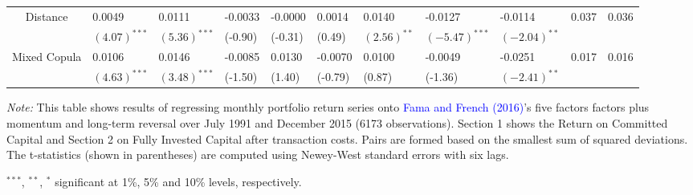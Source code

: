 \documentclass[a4paper]{article}
\begin{document}
\begin{table}[!ht]
\begin{threeparttable}[H]
\begin{tabularx}{\textwidth}{@{\extracolsep{\fill}} lllllllllll@{}}
		\multicolumn{1}{c}{Distance} & 0.0049 & 0.0111 & -0.0033 & -0.0000 & 0.0014 & 0.0140 & -0.0127 & -0.0114 & 0.037 & 0.036 \\
		\multicolumn{1}{c}{} & $(4.07)^{***}$ & $(5.36)^{***}$ & (-0.90) & (-0.31) & (0.49) & $(2.56)^{**}$ & $(-5.47)^{***}$ & $(-2.04)^{**}$ & & \vspace{.1cm}\\
		\multicolumn{1}{c}{Mixed Copula} & 0.0106 & 0.0146 & -0.0085 & 0.0130 & -0.0070 & 0.0100 & -0.0049 & -0.0251 & 0.017 & 0.016 \\
		\multicolumn{1}{c}{} & $(4.63)^{***}$ & $(3.48)^{***}$ & (-1.50) & (1.40) & (-0.79) & (0.87) & (-1.36) & $(-2.41)^{**}$ & & \\
				\bottomrule
			\end{tabularx}
			\begin{tablenotes}
				\item \textit{Note:} \tiny  This table shows results of regressing monthly portfolio return series onto \textcolor{blue}{Fama and French} \textcolor{blue}{(2016)}'s five factors factors plus momentum and long-term reversal over July 1991 and December 2015 (6173 observations). Section 1 shows the Return on Committed Capital and Section 2 on Fully Invested Capital after transaction costs. Pairs are formed based on the smallest sum of squared deviations. The t-statistics (shown in parentheses) are computed using Newey-West standard errors with six lags.
				\item \footnotesize $^{\ast\ast\ast}$, $^{\ast\ast}$, $^{\ast}$  significant at 1\%, 5\% and 10\% levels, respectively.
			\end{tablenotes}
		\end{threeparttable}%
		\label{tab:table105}%
	\end{table}%

\newpage
	
	
	
	

	
\end{document}
